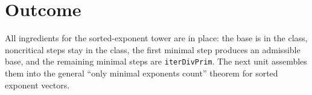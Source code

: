 \documentclass[11pt]{article}
\begin{document}
\section{Outcome}
All ingredients for the sorted-exponent tower are in place: the base is in the class, noncritical
steps stay in the class, the first minimal step produces an admissible base, and the remaining minimal
steps are \texttt{iterDivPrim}. The next unit assembles them into the general ``only minimal exponents
count'' theorem for sorted exponent vectors.
\end{document}
